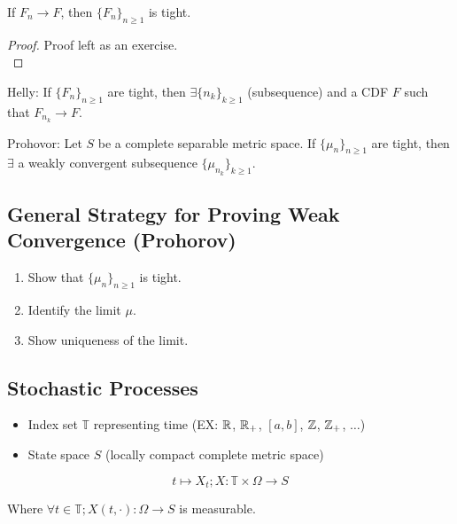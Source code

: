 \documentclass[english, course]{Notes}
\begin{document}
\begin{claim}
If $F_n \to F$, then $\{F_n\}_{n \geq 1}$ is tight.
\end{claim}

\begin{proof}
Proof left as an exercise.\\
\end{proof}

\begin{theorem}
Helly: If $\{F_n\}_{n \geq 1}$ are tight, then $\exists \{n_k\}_{k \geq 1}$ (subsequence) and a CDF $F$ such that $F_{n_k} \to F$.\\
\end{theorem}

\begin{theorem}
Prohovor: Let $S$ be a complete separable metric space. If $\{\mu_n\}_{n \geq 1}$ are tight, then $\exists$ a weakly convergent subsequence $\{\mu_{n_k}\}_{k \geq 1}$.\\
\end{theorem}

\subsection{General Strategy for Proving Weak Convergence (Prohorov)}

\begin{enumerate}
	\item Show that $\{\mu_n\}_{n \geq 1}$ is tight.
	\item Identify the limit $\mu$.
	\item Show uniqueness of the limit.
\end{enumerate}

\subsection{Stochastic Processes}

\begin{itemize}
	\item Index set $\mathbb{T}$ representing time (EX: $\mathbb{R}$, $\mathbb{R}_+$, $[a, b]$, $\mathbb{Z}$, $\mathbb{Z}_+$, $\dots$)
	\item State space $S$ (locally compact complete metric space)
\end{itemize}

\[t \mapsto X_t; X: \mathbb{T} \times \Omega \to S\]

Where $\forall t \in \mathbb{T}; X(t, \cdot): \Omega \to S$ is measurable.
\end{document}
